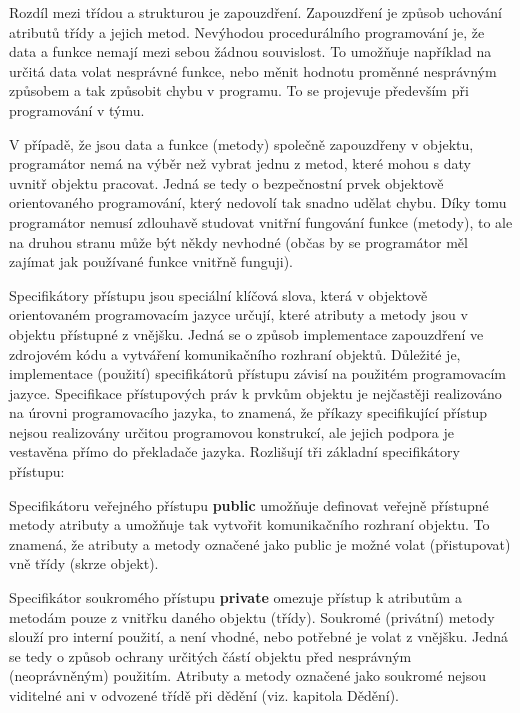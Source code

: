 Rozdíl mezi třídou a strukturou je zapouzdření. Zapouzdření je způsob uchování atributů třídy a jejich metod. Nevýhodou procedurálního programování je, že data a funkce nemají mezi sebou žádnou souvislost. To umožňuje například na určitá data volat nesprávné funkce, nebo měnit hodnotu proměnné nesprávným způsobem a tak způsobit chybu v programu. To se projevuje především při programování v týmu. 

V případě, že jsou data a funkce (metody) společně zapouzdřeny v objektu, programátor nemá na výběr než vybrat jednu z metod, které mohou s daty uvnitř objektu pracovat. Jedná se tedy o bezpečnostní prvek objektově orientovaného programování, který nedovolí tak snadno udělat chybu. Díky tomu programátor nemusí zdlouhavě studovat vnitřní fungování funkce (metody), to ale na druhou stranu může být někdy nevhodné (občas by se programátor měl zajímat jak používané funkce vnitřně funguji).

\vskip 4mm
\centerline{}
\vskip 4mm


Specifikátory přístupu jsou speciální klíčová slova, která v objektově orientovaném programovacím jazyce určují, které atributy a metody jsou v objektu přístupné z vnějšku. Jedná se o způsob implementace zapouzdření ve zdrojovém kódu a vytváření komunikačního rozhraní objektů. Důležité je, implementace (použití) specifikátorů přístupu závisí na použitém programovacím jazyce. Specifikace přístupových práv k prvkům objektu je nejčastěji realizováno na úrovni programovacího jazyka, to znamená, že příkazy specifikující přístup nejsou realizovány určitou programovou konstrukcí, ale jejich podpora je vestavěna přímo do překladače jazyka.
Rozlišují tři základní specifikátory přístupu:
\vskip 3mm
\vskip 3mm


Specifikátoru veřejného přístupu {\bf public} umožňuje definovat veřejně přístupné metody atributy a umožňuje tak vytvořit komunikačního rozhraní objektu. To znamená, že atributy a metody označené jako public je možné volat (přistupovat) vně třídy (skrze objekt). 


Specifikátor soukromého přístupu {\bf private} omezuje přístup k atributům a metodám pouze z vnitřku daného objektu (třídy). Soukromé (privátní) metody slouží pro interní použití, a není vhodné, nebo potřebné je volat z vnějšku. Jedná se tedy o způsob ochrany určitých částí objektu před nesprávným (neoprávněným) použitím. Atributy a metody označené jako soukromé nejsou viditelné ani v odvozené třídě při dědění (viz. kapitola Dědění).

